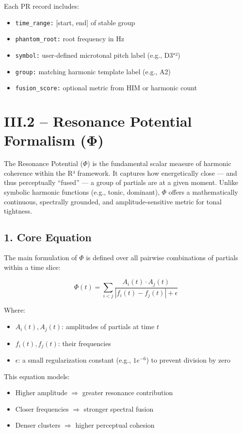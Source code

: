 \documentclass{article}
\begin{document}
Each PR record includes:

\begin{itemize}
    \item \texttt{time\_range:} [start, end] of stable group
    \item \texttt{phantom\_root:} root frequency in Hz
    \item \texttt{symbol:} user-defined microtonal pitch label (e.g., D3⁺²)
    \item \texttt{group:} matching harmonic template label (e.g., A2)
    \item \texttt{fusion\_score:} optional metric from HIM or harmonic count
\end{itemize}

\section*{III.2 – Resonance Potential Formalism (Φ)}

The Resonance Potential ($\Phi$) is the fundamental scalar measure of harmonic coherence within the R³ framework. It captures how energetically close — and thus perceptually “fused” — a group of partials are at a given moment. Unlike symbolic harmonic functions (e.g., tonic, dominant), $\Phi$ offers a mathematically continuous, spectrally grounded, and amplitude-sensitive metric for tonal tightness.

\subsection*{1. Core Equation}

The main formulation of $\Phi$ is defined over all pairwise combinations of partials within a time slice:

\[
\Phi(t) = \sum_{i<j} \frac{A_i(t) \cdot A_j(t)}{|f_i(t) - f_j(t)| + \epsilon}
\]

Where:

\begin{itemize}
    \item $A_i(t), A_j(t)$: amplitudes of partials at time $t$
    \item $f_i(t), f_j(t)$: their frequencies
    \item $\epsilon$: a small regularization constant (e.g., $1e^{-6}$) to prevent division by zero
\end{itemize}

This equation models:

\begin{itemize}
    \item Higher amplitude $\Rightarrow$ greater resonance contribution
    \item Closer frequencies $\Rightarrow$ stronger spectral fusion
    \item Denser clusters $\Rightarrow$ higher perceptual cohesion
\end{itemize}
\end{document}
